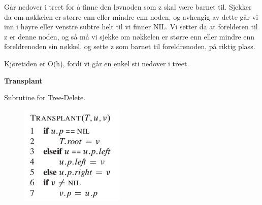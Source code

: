 \documentclass[12pt]{report}
\begin{document}

 \par


\vspace{\baselineskip}
Går nedover i treet for å finne den løvnoden som z skal være barnet til. Sjekker da om nøkkelen er større enn eller mindre enn noden, og avhengig av dette går vi inn i høyre eller venstre subtre helt til vi finner NIL. Vi setter da at forelderen til z er denne noden, og så må vi sjekke om nøkkelen er større enn eller mindre enn foreldrenoden sin nøkkel, og sette z som barnet til foreldrenoden, på riktig plass. \par


\vspace{\baselineskip}
Kjøretiden er O(h), fordi vi går en enkel sti nedover i treet. \par


\vspace{\baselineskip}

\vspace{\baselineskip}
{\fontsize{14pt}{16.8pt}\selectfont \textbf{Transplant}\par}\par


\vspace{\baselineskip}
Subrutine for Tree-Delete. \par


\vspace{\baselineskip}



\begin{figure}[H]
	\begin{Center}
		\includegraphics[width=1.95in,height=1.88in]{./media/image84.png}
	\end{Center}
\end{figure}


\end{document}
